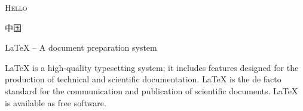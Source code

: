 \documentclass{ctexart}
\begin{document}
	\scshape Hello
	
	\lishu 中国

	LaTeX – A document preparation system
	
	LaTeX is a high-quality typesetting system; it includes features designed for the production of technical and scientific documentation. LaTeX is the de facto standard for the communication and publication of scientific documents. LaTeX is available as free software.
\end{document}
